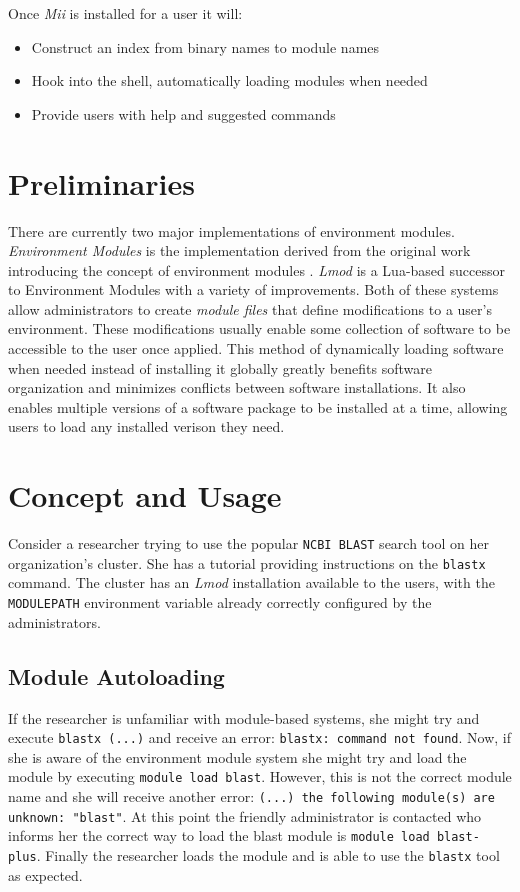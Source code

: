 \documentclass[manuscript,screen]{acmart}
\begin{document}
Once \textit{Mii} is installed for a user it will:
\begin{itemize}
\item Construct an index from binary names to module names
\item Hook into the shell, automatically loading modules when needed
\item Provide users with help and suggested commands
\end{itemize}

\section{Preliminaries}

There are currently two major implementations of environment modules. \textit{Environment Modules} \cite{TclPage} is
the implementation derived from the original work introducing the concept of environment modules \cite{TclPaper}.
\textit{Lmod} \cite{LmodPage} is a Lua-based successor to Environment Modules with a variety of improvements. Both of these
systems allow administrators to create \textit{module files} that define modifications to a user’s environment. These
modifications usually enable some collection of software to be accessible to the user once applied. This
method of dynamically loading software when needed instead of installing it globally greatly benefits software
organization and minimizes conflicts between software installations. It also enables multiple versions of a
software package to be installed at a time, allowing users to load any installed verison they need.

\section{Concept and Usage}

Consider a researcher trying to use the popular \texttt{NCBI BLAST} search tool on her organization’s cluster. She
has a tutorial providing instructions on the \texttt{blastx} command. The cluster has an \textit{Lmod} installation
available to the users, with the \texttt{MODULEPATH} environment variable already correctly configured by the administrators.

\subsection{Module Autoloading}

If the researcher is unfamiliar with module-based systems, she might try and execute \texttt{blastx (...)} and
receive an error: \texttt{blastx: command not found}. Now, if she is aware of the environment module system she
might try and load the module by executing \texttt{module load blast}. However, this is not the correct module
name and she will receive another error: \texttt{(...) the following module(s) are unknown: "blast"}. At this
point the friendly administrator is contacted who informs her the correct way to load the blast module is
\texttt{module load blast-plus}. Finally the researcher loads the module and is able to use the \texttt{blastx} tool as
expected.
\end{document}
